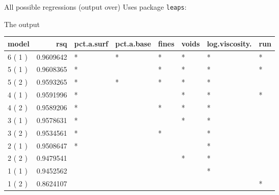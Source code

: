 \begin{frame}[fragile]{All possible regressions (output over)}
\protect\hypertarget{all-possible-regressions-output-over}{}
Uses package \texttt{leaps}:

\begin{Shaded}
\begin{Highlighting}[]
\StringTok{ }\NormalTok{(}\OperatorTok{\textasciitilde{}}\StringTok{ }\OperatorTok{+}\StringTok{ }
\StringTok{                      }\OperatorTok{+}\StringTok{ }\OperatorTok{+}\StringTok{ }\OperatorTok{+}\StringTok{ }
\StringTok{                      }\OperatorTok{+}\StringTok{ }
                     \NormalTok{)}
\StringTok{ }
\StringTok{ }
\end{Highlighting}
\end{Shaded}
\end{frame}

\begin{frame}[fragile]{The output}
\protect\hypertarget{the-output}{}
\scriptsize

\begin{Shaded}
\begin{Highlighting}[]
\OperatorTok{\%\textgreater{}\%}\StringTok{ }\NormalTok{(}\NormalTok{) }\OperatorTok{\%\textgreater{}\%}\StringTok{ }\NormalTok{(}
\end{Highlighting}
\end{Shaded}

\begin{longtable}[]{@{}lrllllll@{}}
\toprule
model & rsq & pct.a.surf & pct.a.base & fines & voids & log.viscosity. &
run\tabularnewline
\midrule
\endhead
6 ( 1 ) & 0.9609642 & * & * & * & * & * & *\tabularnewline
5 ( 1 ) & 0.9608365 & * & & * & * & * & *\tabularnewline
5 ( 2 ) & 0.9593265 & * & * & * & * & * &\tabularnewline
4 ( 1 ) & 0.9591996 & * & & & * & * & *\tabularnewline
4 ( 2 ) & 0.9589206 & * & & * & * & * &\tabularnewline
3 ( 1 ) & 0.9578631 & * & & & * & * &\tabularnewline
3 ( 2 ) & 0.9534561 & * & & * & & * &\tabularnewline
2 ( 1 ) & 0.9508647 & * & & & & * &\tabularnewline
2 ( 2 ) & 0.9479541 & & & & * & * &\tabularnewline
1 ( 1 ) & 0.9452562 & & & & & * &\tabularnewline
1 ( 2 ) & 0.8624107 & & & & & & *\tabularnewline
\bottomrule
\end{longtable}

\normalsize
\end{frame}

